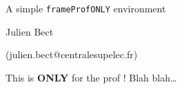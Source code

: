 \documentclass{beamer}
\begin{document}
\begin{frame}
  \vfill
  \begin{center}
    \LARGE
    \alert{A simple \texttt{frameProfONLY} environment}
    \bigskip

    \large
    Julien Bect
    \medskip

    \footnotesize
    (julien.bect@centralesupelec.fr)
  \end{center}
  \vfill
\end{frame}

\begin{frameProfONLY}{This is \textbf{ONLY} for the prof !}
  Blah blah\ldots
\end{frameProfONLY}
\end{document}
